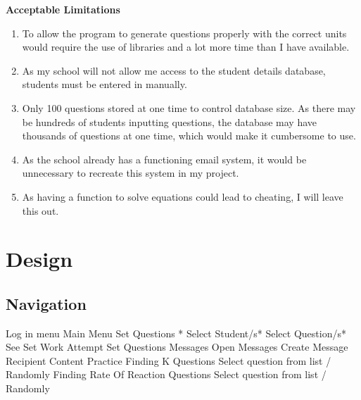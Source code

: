 \documentclass[a4paper,12pt]{book}
\begin{document}
\textbf{Acceptable Limitations}\\
\begin{enumerate}
\item  To allow the program to generate questions properly with the correct units would require the use of libraries and a lot more time than I have available.
\item  As my school will not allow me access to the student details database, students must be entered in manually.
\item  Only 100 questions stored at one time to control database size. As there may be hundreds of students inputting questions, the database may have thousands of questions at one time, which would make it cumbersome to use.
\item As the school already has a functioning email system, it would be unnecessary to recreate this system in my project.
\item  As having a function to solve equations could lead to cheating, I will leave this out.
\end{enumerate}

\chapter{Design}
\section{Navigation}

Log in menu
	Main Menu
		Set Questions *
			Select Student/s*
			Select Question/s*
		See Set Work 
			Attempt Set Questions
		Messages
			Open Messages
			Create Message
				Recipient
				Content
		Practice
			Finding K Questions
				Select question from list / Randomly
			Finding Rate Of Reaction Questions
				Select question from list / Randomly
\end{document}
